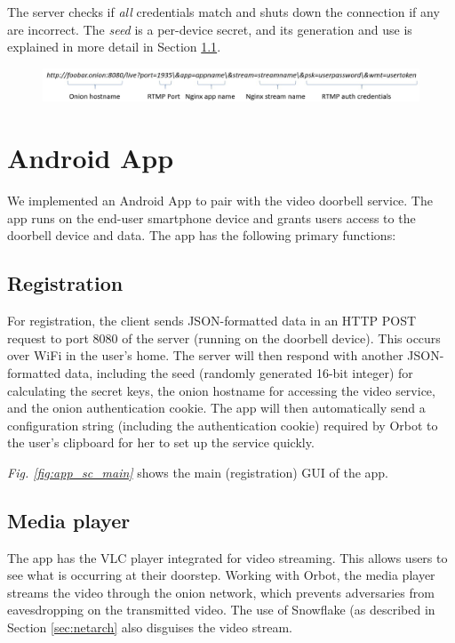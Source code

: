 The server checks if \textit{all} credentials match and shuts down the connection if any are incorrect. The \textit{seed} is a per-device secret, and its generation and use is explained in more detail in Section \ref{sec:registration}.

\begin{figure}
	\includegraphics[width=\linewidth]{fig_url.jpg}
	\caption{}
	\label{fig:url}
\end{figure}



\section{Android App}
We implemented an Android App to pair with the video doorbell service. The app runs on the end-user smartphone device and grants users access to the doorbell device and data. The app has the following primary functions:

\subsection{Registration} 
\label{sec:registration}
For registration, the client sends JSON-formatted data in an HTTP POST request to port 8080 of the server (running on the doorbell device). This occurs over WiFi in the user's home. The server will then respond with another JSON-formatted data, including the seed (randomly generated 16-bit integer) for calculating the secret keys, the onion hostname for accessing the video service, and the onion authentication cookie. The app will then automatically send a configuration string (including the authentication cookie) required by Orbot to the user’s clipboard for her to set up the service quickly. 

\textit{Fig. \ref{fig:app_sc_main}} shows the main (registration) GUI of the app.


\subsection{Media player} The app has the VLC player integrated for video streaming. This allows users to see what is occurring at their doorstep. Working with Orbot, the media player streams the video through the onion network, which prevents adversaries from eavesdropping on the transmitted video. The use of Snowflake (as described in Section \ref{sec:netarch} also disguises the video stream.

